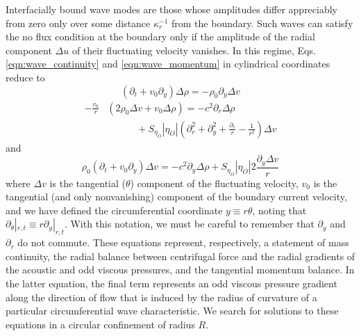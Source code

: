 \documentclass[%
 reprint,
superscriptaddress,
longbibliography,
 amsmath,amssymb,
 prl,
 citeautoscript,
]{revtex4-1}
\begin{document}
Interfacially bound wave modes are those whose amplitudes differ appreciably from zero only over some distance $\kappa_r^{-1}$ from the boundary. Such waves can satisfy the no flux condition at the boundary only if the amplitude of the radial component $\Delta u$ of their fluctuating velocity vanishes. In this regime, Eqs. \ref{eqn:wave_continuity} and \ref{eqn:wave_momentum} in cylindrical coordinates reduce to
\begin{equation}
\left( \partial_t + v_0 \partial_y \right) \Delta \rho = - \rho_0 \partial_y \Delta v
\label{eqn:continuity_bound}
\end{equation}
\begin{equation}
\begin{split}
- \frac{v_0}{r} &\left( 2 \rho_0 \Delta v + v_0 \Delta \rho \right) = - c^2 \partial_r \Delta \rho \\
&\quad \quad \quad+ S_{\eta_O} \left| \eta_O \right| \left( \partial_r^2 + \partial_y^2 + \frac{\partial_r}{r} - \frac{1}{r^2} \right) \Delta v
\end{split}
\label{eqn:umomentum_bound}
\end{equation}
and
\begin{equation}
\rho_0 \left( \partial_t + v_0 \partial_y \right) \Delta v = - c^2 \partial_y \Delta \rho + S_{\eta_O} \left| \eta_O \right| 2 \frac{\partial_y \Delta v}{r}
\label{eqn:vmomentum_bound}
\end{equation}
where $\Delta v$ is the tangential ($\theta$) component of the fluctuating velocity, $v_0$ is the tangential (and only nonvanishing) component of the boundary current velocity, and we have defined the circumferential coordinate $y \equiv r \theta$, noting that $\partial_{\theta} |_{r,t} \equiv r \partial_y |_{r,t}$. With this notation, we must be careful to remember that $\partial_y$ and $\partial_r$ do not commute. These equations represent, respectively, a statement of mass continuity, the radial balance between centrifugal force and the radial gradients of the acoustic and odd viscous pressures, and the tangential momentum balance. In the latter equation, the final term represents an odd viscous pressure gradient along the direction of flow that is induced by the radius of curvature of a particular circumferential wave characteristic. We search for solutions to these equations in a circular confinement of radius $R$.
\end{document}
